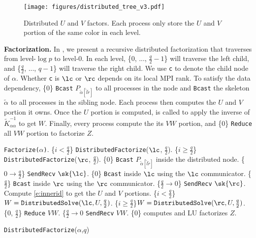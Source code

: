\begin{figure}[!t]
  \centering
  \texttt{[image: figures/distributed\_tree\_v3.pdf]}
  \caption{Distributed $U$ and $V$ factors. Each process
  only store the $U$ and $V$ portion of the same color in each
  level.}
  \label{fig:matrix}
\end{figure}

{\bf Factorization.}
In , we present a recursive distributed 
factorization that traverses from level-$\log{p}$ to level-0.
In each level, \{0, ..., $\frac{q}{2}-1$\} will traverse the left child,
and \{$\frac{q}{2}$, ..., $q-1$\} will traverse the right child. 
We use \texttt{c} to denote the child node of $\alpha$.
Whether \texttt{c} is $\lc$ or $\rc$ depends on its local MPI rank.
To satisfy the data dependency, \{0\} \texttt{Bcast} 
$P_{\tilde{\alpha}[\tilde{l}\tilde{r}]}$ to all processes in the node
and \texttt{Bcast} the skeleton $\tilde{\alpha}$ to all processes
in the sibling node.
Each process then computes the $U$ and $V$ portion it owns.
Once the $U$ portion is computed,  is called
to apply the inverse of $\tilde{K}^{-1}_{\alpha\alpha}$ to get $W$.
Finally, every process compute the its $VW$ portion, and 
\{0\} \texttt{Reduce} all $VW$ portion to factorize $Z$.






\begin{algorithm}[!htp]
\begin{algorithmic}
    \STATE \texttt{Factorize($\alpha$)}.
  \ELSE
    \STATE \{$i<\frac{q}{2}$\} \texttt{DistributedFactorize}($\lc$, $\frac{q}{2}$).
    \STATE \{$i\geq\frac{q}{2}$\} \texttt{DistributedFactorize}($\rc$, $\frac{q}{2}$).
    \STATE \{0\} \texttt{Bcast} $P_{\tilde{\alpha}[\tilde{l}\tilde{r}]}$ inside the distributed node.
    \STATE \{$0\rightarrow\frac{q}{2}$\} \texttt{SendRecv} $\sk{\lc}$.
    \STATE \{0\} \texttt{Bcast} inside $\lc$ using the $\lc$ communicator.
    \STATE \{$\frac{q}{2}$\} \texttt{Bcast} inside $\rc$ using the $\rc$ communicator.
    \STATE \{$\frac{q}{2}\rightarrow0$\} \texttt{SendRecv} $\sk{\rc}$.
    \STATE Compute \eqref{e:innerid} to get the $U$ and $V$ portions.
    \STATE \{$i<\frac{q}{2}$\}$W=\texttt{DistributedSolve}(\lc, U, \frac{q}{2})$.
    \STATE \{$i\geq\frac{q}{2}$\}$W=\texttt{DistributedSolve}(\rc, U, \frac{q}{2})$.
    \STATE \{0, $\frac{q}{2}$\} \texttt{Reduce} $VW$.
    \STATE \{$\frac{q}{2}\rightarrow0$ \texttt{SendRecv} $VW$.
    \STATE \{0\} computes and LU factorizes $Z$.
  \ENDIF
\end{algorithmic}
\caption{{} \texttt{DistributedFactorize}($\alpha$,$q$)}
\label{a:distributedfactor}
\end{algorithm}


